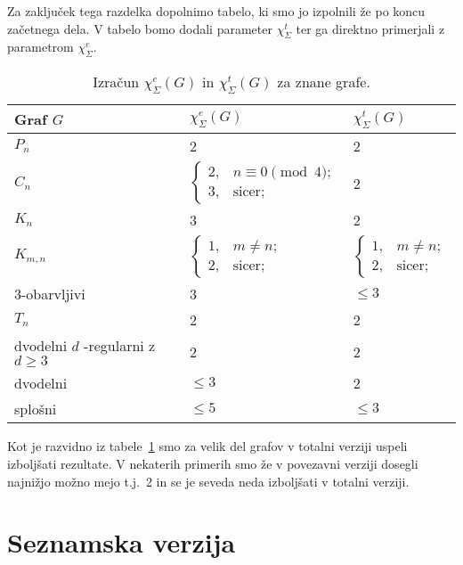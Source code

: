 \documentclass[12pt,a4paper,twoside]{article}
\theoremstyle{definition} %
\theoremstyle{plain} %
\newcommand{\ec}{\chi_{\Sigma}^e}
\newcommand{\ect}{\chi_{\Sigma}^t}
\numberwithin{equation}{section}  %
\begin{document}
Za zaključek tega razdelka dopolnimo tabelo, ki smo jo izpolnili že po koncu začetnega dela. V tabelo bomo dodali parameter $\ect$ ter ga direktno primerjali z parametrom $\ec$.
\begin{table}[H]
\caption{\label{tab:tab2} Izračun $\ec(G)$ in $\ect(G)$ za znane grafe. \label{tab_second}}
\centering
\begin{tabular}{|l|l|l|}
\hline
 Graf $G$ & $\ec(G)$ & $\ect(G) $ \\ \hline
 $P_n$ & 2 & 2 \\ \hline
 $C_n$ & $\begin{cases}
	2, & n \equiv 0 \pmod{4};\\ 
	3, & \text{sicer};
	\end{cases}$ & 2 \\ \hline
 $K_n$& 3 & 2 \\ \hline
 $K_{m,n}$& $\begin{cases}
	1 ,& m \neq n;\\ 
	2 ,& \text{sicer};
	\end{cases}$ &$\begin{cases}
	1, & m \neq n;\\ 
	2, & \text{sicer};
	\end{cases}$ \\ \hline
 $3$-obarvljivi& 3 & $\le 3$ \\ \hline
$T_n$ & 2 & 2\\ \hline
dvodelni $d$ -regularni z $d \ge 3 $ & 2  & 2\\ \hline
dvodelni   & $\le 3$  & 2\\ \hline
splošni   & $\le 5$  &$ \le 3$\\ \hline
\end{tabular}
\end{table}
Kot je razvidno iz tabele~\ref{tab_second} smo za velik del grafov v totalni verziji uspeli izboljšati rezultate. V nekaterih primerih smo že v povezavni verziji dosegli najnižjo možno mejo t.j.\ 2 in se je seveda neda izboljšati v totalni verziji.


\section{Seznamska verzija} 
\end{document}
